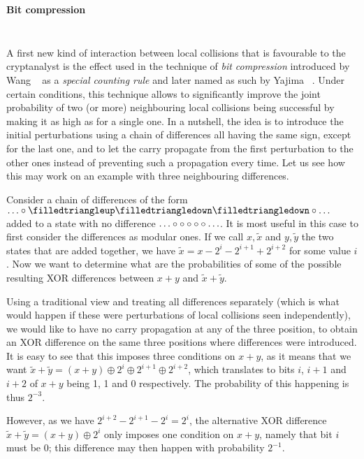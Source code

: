 \medskip

\paragraph{Bit compression}
$\phantom{bouh}$

\medskip

\noindent
A first new kind of interaction between local collisions that is favourable to the cryptanalyst is the effect used in the technique of \emph{bit compression} introduced by Wang \etal~\cite{DBLP:conf/crypto/WangYY05a}
as a \emph{special counting rule} and later named as such by Yajima \etal~\cite{DBLP:conf/ccs/YajimaINSSKO08}. Under certain conditions, this technique allows to significantly
improve the joint probability of two (or more) neighbouring local collisions being successful by making it as high as for a single one. In a nutshell, the idea is to introduce the initial perturbations
using a chain of differences all
having the same sign, except for the last one, and to let the carry propagate from the first
perturbation to the other ones instead of preventing such a propagation every time.
Let us see how this may work on an example with three neighbouring differences.

\begin{example}
\label{ex:bit_comp}
Consider a chain of differences of the form $\ldots\mnodiff\monediffu\monediffd\monediffd\mnodiff\ldots$ added to a state with no difference $\ldots\circ\circ\circ\circ\circ\ldots$.
It is most useful in this case to first consider the differences as modular ones. If we call $x,\widetilde{x}$ and $y,\widetilde{y}$ the two states that are added together, we
have $\widetilde{x} = x - 2^{i} - 2^{i+1} + 2^{i+2}$ for some value $i$. Now we want to determine what are the probabilities of some of the possible resulting XOR differences between $x + y$ and $\widetilde{x} + \widetilde{y}$.

Using a traditional view and treating all differences separately (which is what would happen if these were perturbations of local collisions seen independently), we would like to have no
carry propagation at any of the three position, to obtain an XOR difference on the same three positions where differences were introduced. It is easy to see that this imposes three conditions
on $x + y$, as it means that we want $\widetilde{x} + \widetilde{y} = (x + y) \oplus 2^{i} \oplus 2^{i+1} \oplus 2^{i+2}$, which translates to bits $i$, $i+1$ and $i+2$ of $x+y$ being 1, 1 and 0 respectively.
The probability of this happening is thus $2^{-3}$.

However, as we have $2^{i+2} - 2^{i+1} - 2^{i} = 2^{i}$, the alternative XOR difference $\widetilde{x} + \widetilde{y} = (x + y) \oplus 2^{i}$ only imposes one condition on $x + y$, namely that bit $i$
must be 0; this difference may then happen with probability $2^{-1}$.
\end{example}

